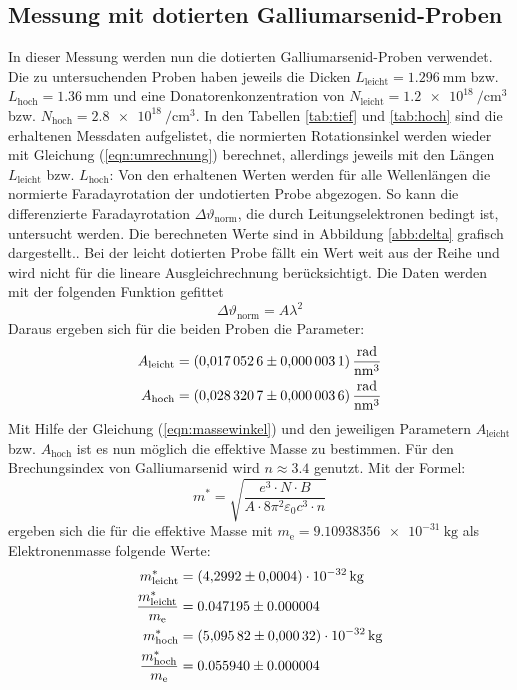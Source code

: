 \subsection{Messung mit dotierten Galliumarsenid-Proben}
\label{sec:dot}
In dieser Messung werden nun die dotierten Galliumarsenid-Proben verwendet.
Die zu untersuchenden Proben haben jeweils die Dicken $L_{\mathrm{leicht}}=\SI{1.296}{\milli\meter}$ bzw. $L_{\mathrm{hoch}}=\SI{1.36}{\milli\meter}$ und eine Donatorenkonzentration von $N_{\mathrm{leicht}}=\SI{1.2 e18}{\per\centi\cubic\meter}$ bzw. $N_{\mathrm{hoch}}=\SI{2.8 e18}{\per\centi\cubic\meter}$.
In den Tabellen \ref{tab:tief} und \ref{tab:hoch} sind die erhaltenen Messdaten aufgelistet, die normierten Rotationsinkel werden wieder mit Gleichung (\ref{eqn:umrechnung}) berechnet, allerdings jeweils mit den Längen $L_{\mathrm{leicht}}$ bzw. $L_{\mathrm{hoch}}$:
Von den erhaltenen Werten werden für alle Wellenlängen die normierte Faradayrotation der undotierten Probe abgezogen.
So kann die differenzierte Faradayrotation $\Delta\vartheta_\mathrm{norm}$, die durch Leitungselektronen bedingt ist, untersucht werden.
Die berechneten Werte sind in Abbildung \ref{abb:delta} grafisch dargestellt..
Bei der leicht dotierten Probe fällt ein Wert weit aus der Reihe und wird nicht für die lineare Ausgleichrechnung berücksichtigt.
Die Daten werden mit der folgenden Funktion gefittet
\begin{equation}
  \Delta\vartheta_{\mathrm{norm}} = A\lambda^2
\end{equation}
Daraus ergeben sich für die beiden Proben die Parameter:
\begin{align*}
  A_{\mathrm{leicht}} &= \SI{0.0170526 \pm 0.0000031}{\radian\per\nano\cubic\meter} \\
  A_{\mathrm{hoch}} &= \SI{0.0283207 \pm 0.0000036}{\radian\per\nano\cubic\meter}
\end{align*}
Mit Hilfe der Gleichung (\ref{eqn:massewinkel}) und den jeweiligen Parametern $A_{\mathrm{leicht}}$ bzw. $A_{\mathrm{hoch}}$ ist es nun möglich die effektive Masse zu bestimmen.
Für den Brechungsindex von Galliumarsenid wird $n \approx 3.4$ \cite{nGaAs} genutzt.
Mit der Formel:
\begin{equation}
  m^*=\sqrt{\frac{e^3\cdot N \cdot B}{A\cdot 8\pi^2\varepsilon_\mathrm{0} c^3 \cdot n }}
\end{equation}
ergeben sich die für die effektive Masse mit $m_\mathrm{e} = \SI{9.10938356 e-31}{\kilogram}$ als Elektronenmasse folgende Werte:
\begin{align*}
  m^*_{\mathrm{leicht}} &= \SI{4.2992 \pm 0.0004 e-32}{\kilogram} \\
  \frac{m^*_{\mathrm{leicht}}}{m_\mathrm{e}} &= 0.047195\pm 0.000004 \\
  m^*_{\mathrm{hoch}} &= \SI{5.09582 \pm 0.00032 e-32}{\kilogram} \\
  \frac{m^*_{\mathrm{hoch}}}{m_\mathrm{e}} &= 0.055940\pm 0.000004\\
\end{align*}

